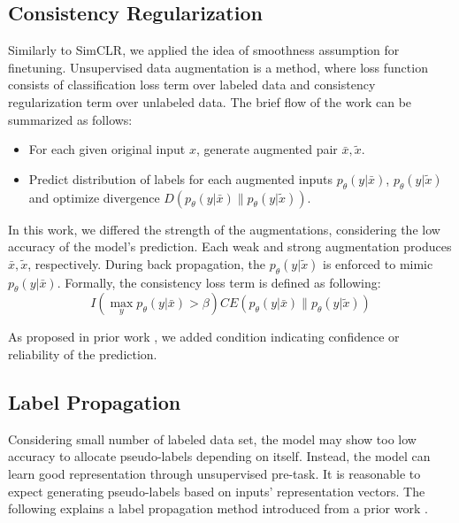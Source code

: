 \documentclass[10pt,twocolumn,letterpaper]{article}
\begin{document}
\subsection{Consistency Regularization}

Similarly to SimCLR, we applied the idea of smoothness assumption for finetuning. Unsupervised data augmentation \cite {Xie2020} is a method, where loss function consists of classification loss term over labeled data and consistency regularization term over unlabeled data. The brief flow of the work can be summarized as follows:
\begin{itemize}
    \item For each given original input $x$, generate augmented pair $\bar{x}, \tilde{x}$.
    \item Predict distribution of labels for each augmented inputs $p_\theta\left(y|\bar{x}\right)$, $p_\theta\left(y|\tilde{x}\right)$ and optimize divergence $D\left(p_\theta\left(y|\bar{x}\right) \parallel p_\theta\left(y|\tilde{x}\right)\right)$.
\end{itemize}
In this work, we differed the strength of the augmentations, considering the low accuracy of the model's prediction. Each weak and strong augmentation produces $\bar{x}, \tilde{x}$, respectively. During back propagation, the $p_\theta\left(y|\tilde{x}\right)$ is enforced to mimic $p_\theta\left(y|\bar{x}\right)$. Formally, the consistency loss term is defined as following:
\begin{equation}
    I\left(\max_y p_\theta\left(y|\bar{x}\right) > \beta\right) CE \left(p_\theta\left(y|\bar{x}\right)\parallel p_\theta\left(y|\tilde{x}\right)\right)
\end{equation}

As proposed in prior work \cite{Xie2020}, we added condition indicating confidence or reliability of the prediction. 

\subsection{Label Propagation}

Considering small number of labeled data set, the model may show too low accuracy to allocate pseudo-labels depending on itself. Instead, the model can learn good representation through unsupervised pre-task. It is reasonable to expect generating pseudo-labels based on inputs' representation vectors. The following explains a  label propagation method introduced from a prior work \cite{Iscen2019}.
\end{document}
